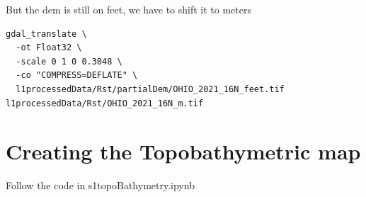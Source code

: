 \documentclass[11pt, a4paper]{article}
\begin{document}
But the dem is still on feet, we have to shift it to meters

\begin{lstlisting}[style=bashdark, title={Linux Terminal Session}]
gdal_translate \
  -ot Float32 \
  -scale 0 1 0 0.3048 \
  -co "COMPRESS=DEFLATE" \
  l1processedData/Rst/partialDem/OHIO_2021_16N_feet.tif l1processedData/Rst/OHIO_2021_16N_m.tif
\end{lstlisting}

\section{Creating the Topobathymetric map}

Follow the code in s1topoBathymetry.ipynb
\end{document}
